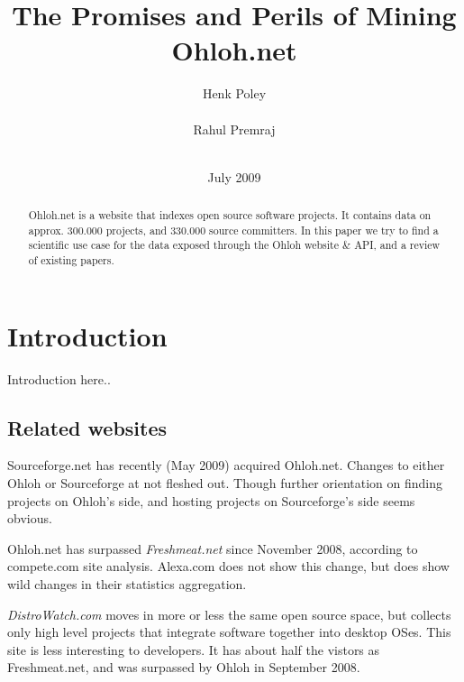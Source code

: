 \documentclass{sig-alternate}
\begin{document}

\title{The Promises and Perils of Mining Ohloh.net}

\author{
\alignauthor
Henk Poley\\
  \\
\alignauthor Rahul Premraj\\
\\
}

\date{July 2009}


\maketitle

\begin{abstract}
Ohloh.net is a website that indexes open source software projects. It contains data on approx. 300.000 projects, and 330.000 source committers. In this paper we try to find a scientific use case for the data exposed through the Ohloh website \& API, and a review of existing papers.
\end{abstract}


\section{Introduction}
Introduction here..

\subsection{Related websites}
Sourceforge.net has recently (May 2009) acquired Ohloh.net. Changes to either Ohloh or Sourceforge at not fleshed out. Though further orientation on finding projects on Ohloh's side, and hosting projects on Sourceforge's side seems obvious.

Ohloh.net has surpassed \emph{Freshmeat.net} since November 2008, according to compete.com site analysis. Alexa.com does not show this change, but does show wild changes in their statistics aggregation.

\emph{DistroWatch.com} moves in more or less the same open source space, but collects only high level projects that integrate software together into desktop OSes. This site is less interesting to developers. It has about half the vistors as Freshmeat.net, and was surpassed by Ohloh in September 2008.
\end{document}
